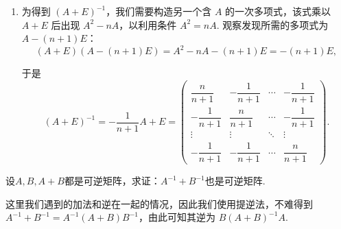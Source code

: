 \begin{exercise}
\begin{exgroup}
\begin{answer}
\begin{enumerate}
                \item 为得到 $(A+E)^{-1}$，我们需要构造另一个含 $A$ 的一次多项式，该式乘以 $A+E$ 后出现 $A^2 - nA$，以利用条件 $A^2 = nA$. 观察发现所需的多项式为 $A - (n+1)E$：
                    \[
                        (A+E)(A-(n+1)E) = A^2 - nA -(n+1)E = -(n+1)E,
                    \]

                    于是
                    \[
                        (A+E)^{-1} = -\frac{1}{n+1} A + E = \begin{pmatrix}
                            \dfrac{n}{n+1}  & -\dfrac{1}{n+1} & \cdots & -\dfrac{1}{n+1} \\[2em]
                            -\dfrac{1}{n+1} & \dfrac{n}{n+1}  & \cdots & -\dfrac{1}{n+1} \\[2em]
                            \vdots          & \vdots          & \ddots & \vdots          \\[2em]
                            -\dfrac{1}{n+1} & -\dfrac{1}{n+1} & \cdots & \dfrac{n}{n+1}
                        \end{pmatrix}.
                    \]
            \end{enumerate}
        \end{answer}

        \item 设$A,B,A+B$都是可逆矩阵，求证：$A^{-1}+B^{-1}$也是可逆矩阵.
        \begin{answer}
            这里我们遇到的加法和逆在一起的情况，因此我们使用提逆法，不难得到 $A^{-1}+B^{-1}=A^{-1}(A+B)B^{-1}$，由此可知其逆为 $B(A+B)^{-1}A$.
        \end{answer}


\end{exgroup}
\end{exercise}
